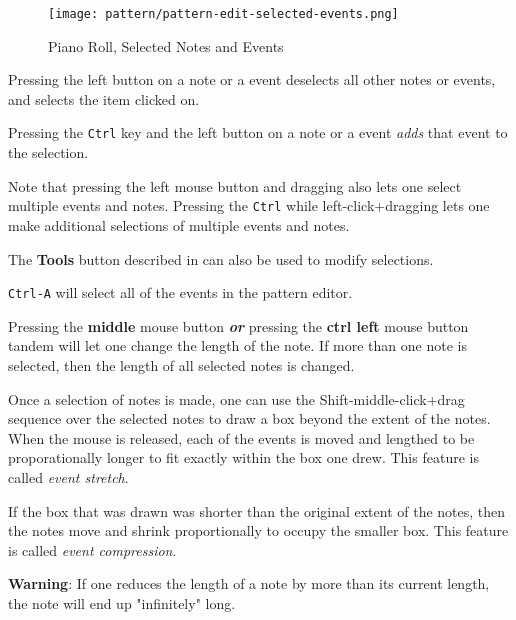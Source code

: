 \begin{figure}[H]
   \centering 
   \texttt{[image: pattern/pattern-edit-selected-events.png]}
   \caption{Piano Roll, Selected Notes and Events}
   \label{fig:pattern_editor_selected_events}
\end{figure}

   Pressing the left button on a note or a event deselects all other notes
   or events, and selects the item clicked on.

   Pressing the \texttt{Ctrl} key and the left button on a note or a event
   \textsl{adds} that event to the selection.

   Note that pressing the left mouse button and dragging also lets one
   select multiple events and notes.
   Pressing the \texttt{Ctrl} while left-click+dragging lets one
   make additional selections of multiple events and notes.

   The \textbf{Tools} button described in
    can also be used to
   modify selections.

   \texttt{Ctrl-A} will select all of the events in the pattern editor.

   Pressing the \textbf{middle} mouse button \textbf{\textsl{or}}
   pressing the \textbf{ctrl left} mouse button tandem will let one change 
	the length of the note. 
   If more than one note is selected, then the length of all selected notes
   is changed.

   Once a selection of notes is made, one can use the
   Shift-middle-click+drag sequence over the selected notes to
   draw a box beyond the extent of the notes.  When the mouse is released,
   each of the events is moved and lengthed to be proporationally longer to
   fit exactly within the box one drew.
   This feature is called \textsl{event stretch}.

   If the box that was drawn was shorter than the original extent of the
   notes, then the notes move and shrink proportionally to occupy the
   smaller box.
   This feature is called \textsl{event compression}.
   
   \textbf{Warning}:  If one reduces the length of a note by more than its
   current length, the note will end up "infinitely" long.

